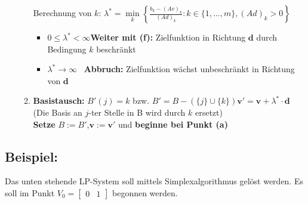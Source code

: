 \begin{enumerate}
\begin{enumerate}
	Berechnung von $k$: $\lambda^* = \min\limits_k \left\{ \frac{b_k-(Av)_k}{(Ad)_k}: k \in \{1, ..., m\}, (Ad)_k > 0\right\}$
		
	\begin{itemize}
		\item $0\leq\lambda^*<\infty$\qquad \textbf{Weiter mit (f):} Zielfunktion in Richtung $\mathbf{d}$ durch Bedingung $k$ beschränkt
		\item $\lambda^*\rightarrow\infty$\qquad\quad~ \textbf{Abbruch:} Zielfunktion wächst unbeschränkt in Richtung von $\mathbf{d}$
	\end{itemize}
	\item \textbf{Basistausch:} $B'(j)=k$ bzw. $B' = B - (\{j\} \cup \{k\})$\qquad $\boxed{\mathbf{v'}=\mathbf{v}+\lambda^*\cdot \mathbf{d}}$\quad (Die Basis an $j$-ter Stelle in B wird durch $k$ ersetzt)\\
	
	\textbf{Setze} $\boxed{B:=B'}$,\quad $\boxed{\mathbf{v}:=\mathbf{v'}}$ und \textbf{beginne bei Punkt (a)}
	\end{enumerate}
\end{enumerate}

\subsection{Beispiel:}
Das unten stehende LP-System soll mittels Simplexalgorithmus gelöst werden. Es soll im Punkt $V_0=\begin{bmatrix}0 & 1\end{bmatrix}$ begonnen werden.\\

